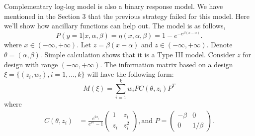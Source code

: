 \documentclass[11pt]{amsart}
\theoremstyle{definition}
\theoremstyle{remark}
\numberwithin{equation}{section}
\begin{document}
Complementary log-log model is also a binary response model. We have mentioned in the Section 3 that the previous strategy failed for this model. Here we'll show how ancillary functions can help out. The model is as follows,\[
P(y=1|x,\alpha, \beta) = \eta(x,\alpha, \beta)= 1-e^{-e^{\beta(x-\alpha)}}.
\] where $x\in (-\infty,+\infty)$. Let $z = \beta(x-\alpha)$ and $z\in (-\infty,+\infty)$. Denote $\theta = (\alpha,\beta) $. Simple calculation shows that it is a Type III model. Consider $z$ for design with range $(-\infty, +\infty)$. The information matrix based on a design $\xi = \{(z_i,w_i), i=1,\ldots,k\}$ will have the following form: \begin{equation}
M(\xi) = \sum_{i=1}^{k} w_i PC(\theta,z_i) P^T
\end{equation} where \begin{align*}
     C(\theta,z_i) & = \frac{e^{2z_i}}{e^{e^{z_i}}-1}\left( \begin{array}{cc}
1 & z_i\\
z_i & z_i^2
\end{array} \right), \text{and }
P = \left( \begin{array}{cc}
-\beta & 0\\
0 & 1/\beta
\end{array} \right).
\end{align*}

\end{document}
